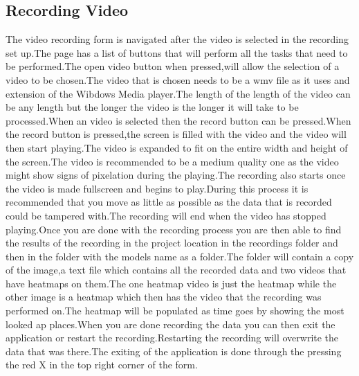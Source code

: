 \subsection{Recording Video}
The video recording form is navigated after the video is selected in the recording set up.The page has a list of buttons that will perform all the tasks that need to be performed.The open video button when pressed,will allow the selection of a video to be chosen.The video that is chosen needs to be a wmv file as it uses and extension of the Wibdows Media player.The length of the length of the video can be any length but the longer the video is the longer it will take to be processed.When an video is selected then the record button can be pressed.When the record button is pressed,the screen is filled with the video and the video will then start playing.The video is expanded to fit on the entire width and height of the screen.The video is recommended to be a medium quality one as the video might show signs of pixelation during the playing.The recording also starts once the video is made fullscreen and begins to play.During this process it is recommended that you move as little as possible as the data that is recorded could be tampered with.The recording will end when the video has stopped playing.Once you are done with the recording process you are then able to find the results of the recording in the project location in the recordings folder and then in the folder with the models name as a folder.The folder will contain a copy of the image,a text file which contains all the recorded data and two videos that have heatmaps on them.The one heatmap video is just the heatmap while the other image is a heatmap which then has the video that the recording was performed on.The heatmap will be populated as time goes by showing the most looked ap places.When you are done recording the data you can then exit the application or restart the recording.Restarting the recording will overwrite the data  that was there.The exiting of the application is done through the pressing the red X in the top right corner of the form.


